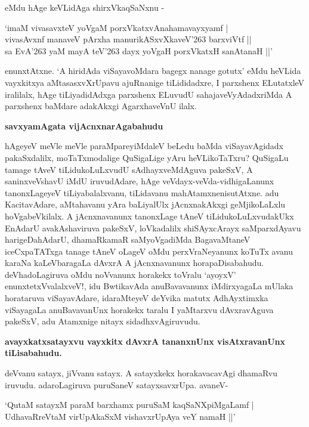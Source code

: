 \noindent
eMdu hAge keVLidAga shirxVkaqSaNxnu -

\begin{shloka}
`imaM vivasavxteV yoVgaM porxVkatxvAnahamavayxyamf |\\\label{107}
vivasAvxnf manaveV pArxha manurikASxvXkaveV\char'263 barxviVtf ||\\
sa EvA\char'263 yaM mayA teV\char'263 dayx yoVgaH porxVkatxH sanAtanaH ||'\label{107}
\end{shloka}

\noindent
enunxtAtxne. `A hiridAda viSayavoMdara bagegx nanage gotutx' eMdu heVLida vayxkitxya aMta\-sasxvX\-rU\-pavu ajuRnanige tiLididadxre, I parxshenx ELutatxleV iralilalx, hAge tiLiyadidAdxga parxshenx ELuvudU sahaja\-veVyAdadxriMda A parxshenx baMdare adakAkxgi AgarxhaveVnU ilalx.

{\bigskip
\noindent
{\large\bf savxyamAgata vijAcnxnarAgabahudu}}\label{page107}
\medskip

\noindent
hAgeyeV meVle meVle paraMpareyiMdaleV beLedu baMda viSayavAgidadx pakaSxdalilx, moTaTxmoda\-lige QuSigaLige yAru heVLikoTaTxru? QuSigaLu tamage tAveV tiLidukoLuLxvudU sAdhayxveMdAguva pakeSxV, A saninxveVshavU iMdU iruvudAdare, hAge veVdayx-veVda-vidhigaLanunx tanonxLageyeV tiLiyabalalx\-vanu, tiLidavanu mahAtamxnenisutAtxne. adu KacitavAdare, aMtahavanu yAra baLiyalUlx jAcnxnakAkxgi geMji\-koLaLxlu hoVgabeVkilalx. A jAcnxnavanunx tanonxLage tAneV tiLidukoLuLxvudakUkx EnAdarU avakAshaviruva pakeSxV, loVkadalilx shiSAyxcArayx saMparxdAyavu harigeDahAdarU, dhamaRkamaR saMyoVgadiMda Baga\-vaM\-taneV iceCxpaTATxga tanage tAneV oLageV oMdu perxVraNeyanunx koTuTx avanu karaNa kaLeVbaragaLa dAvxrA A jAcnxnavanunx horapaDisabahudu. deVhadoLagiruva oMdu noVvanunx horakekx toVralu `ayoyxV' enunxtetxVvalalxveV!, idu BwtikavAda anuBavavanunx iMdirxyagaLa mUlaka horataruva viSayavAdare, idaraMteyeV deYvika matutx AdhAyxtimxka viSayagaLa anuBavavanUnx horakekx taralu I yaMtarxvu dAvxravA\-guva pakeSxV, adu Atamxnige nitayx sidadhxvAgiruvudu.

{\bigskip
\noindent
{\large\bf avayxkatxsatayxvu vayxkitx dAvxrA tananxnUnx visAtxravanUnx tiLisabahudu.}}\label{page108}
\medskip

\noindent
deVvanu satayx, jiVvanu satayx. A satayxkekx horakavacavAgi dhamaRvu iruvudu. adaroLagiruva puru\-SaneV satayxsavxrUpa. avaneV-

\begin{shloka}
`QutaM satayxM paraM barxhamx puruSaM kaqSaNXpiMgaLamf |\\\label{108}
UdhavaRreVtaM virUpAkaSxM vishavxrUpAya veY namaH ||'
\end{shloka}

